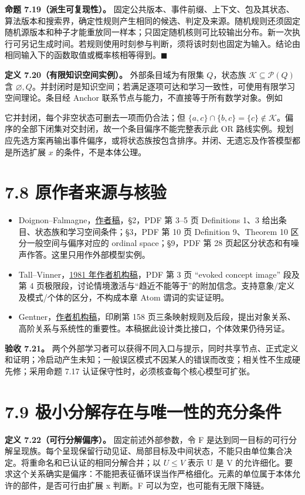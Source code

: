 \documentclass[UTF8,a4paper,zihao=-4,fontset=windows,openany]{ctexbook}
\newcommand{\mcsdisplay}[1]{%
  \par\addvspace{0.7em}%
  \sbox{\mcsmathbox}{\ensuremath{\displaystyle #1}}%
  \ifdim\wd\mcsmathbox>\linewidth
    \noindent\resizebox{\linewidth}{!}{\usebox{\mcsmathbox}}%
  \else
    \noindent\hspace*{\fill}\usebox{\mcsmathbox}\hspace*{\fill}%
  \fi
  \par\addvspace{0.7em}%
}
\def\ensuremath#1{#1}%
\begin{document}
\textbf{命题 7.19（派生可复现性）。} 固定公共版本、事件前缀、上下文、包及其状态、算法版本和搜索界，确定性规则产生相同的候选、判定及来源。随机规则还须固定随机源版本和种子才能重放同一样本；只固定随机核则可比较输出分布。新一次执行可另记生成时间。若规则使用时刻参与判断，须将该时刻也固定为输入。结论由相同输入下的函数取值或概率核相等得到。\(\blacksquare\)

\textbf{定义 7.20（有限知识空间实例）。} 外部条目域为有限集 \(Q\)，状态族 \(\mathcal K\subseteq\mathcal P(Q)\) 含 \(\varnothing,Q\)。并封闭时是知识空间；若满足逐项可达和学习一致性，可使用有限学习空间理论。条目经 Anchor 联系节点与能力，不直接等于所有数学对象。例如


\mcsdisplay{\mathcal K=\{\varnothing,\{a\},\{b\},\{a,b\},\{a,c\},\{b,c\},\{a,b,c\}\}.}
\noindent 它并封闭，每个非空状态可删去一项而仍合法；但 \(\{a,c\}\cap\{b,c\}=\{c\}\notin\mathcal K\)。偏序的全部下闭集对交封闭，故一个条目偏序不能完整表示此 OR 路线实例。规划应先选方案再输出事件偏序，或将状态族按包含排序。并闭、无遗忘及作答模型都是所选扩展 \(x\) 的条件，不是本体公理。

\section{7.8 原作者来源与核验}
\begin{itemize}
\item Doignon–Falmagne，\href{https://arxiv.org/pdf/1511.06757}{作者稿}，§2，PDF 第 3–5 页 Definitions 1、3 给出条目、状态族和学习空间条件；§3，PDF 第 10 页 Definition 9、Theorem 10 区分一般空间与偏序对应的 ordinal space；§9，PDF 第 28 页起区分状态和有噪声作答。这里只用作外部模型实例。
\item Tall–Vinner，\href{https://wrap.warwick.ac.uk/id/eprint/507/1/WRAP\_Tall\_dot1981a-concept-image.pdf}{1981 年作者机构稿}，PDF 第 3 页 “evoked concept image” 段及第 4 页极限段，讨论情境激活与“趋近不能等于”的附加信念。支持意象/定义及模式/个体的区分，不构成本章 Atom 谓词的实证证明。
\item Gentner，\href{https://groups.psych.northwestern.edu/gentner/papers/Gentner83.2b.pdf}{作者机构稿}，印刷第 158 页三条映射规则及后段，提出对象关系、高阶关系与系统性的重要性。本稿据此设计类比接口，个体效果仍待另证。
\end{itemize}
\textbf{验收 7.21。} 两个外部学习者可以获得不同入口与提示，同时共享节点、正式定义和证明；冷启动产生未知；一般误区模式不因某人的错误而改变；相关性不生成硬先修；采用命题 7.17 认证保守性时，必须核查每个核心模型可扩张。

\section{7.9 极小分解存在与唯一性的充分条件}
\textbf{定义 7.22（可行分解偏序）。} 固定前述外部参数，令 F 是达到同一目标的可行分解呈现族。每个呈现保留行动见证、局部目标及中间状态，不能只由单位集合决定。将重命名和已认证的相同分解合并；以 \(U\le V\) 表示 U 是 V 的允许细化。要求这个关系确实是偏序：不能把表征循环误当作严格细化。元素的单位属于本体允许的部件，是否可行由扩展 x 判断。F 可以为空，也可能有无限下降链。
\end{document}
